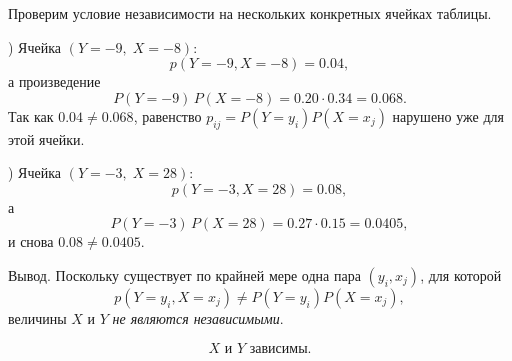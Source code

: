 \documentclass[a4paper,14pt]{extarticle}
\begin{document}
            Проверим условие независимости на нескольких конкретных ячейках таблицы.
            
            ) Ячейка $(Y=-9,\;X=-8)$:
            \[
                p(Y=-9,X=-8)=0.04,
            \]
            а произведение
            \[
                P(Y=-9)\,P(X=-8)=0.20\cdot0.34=0.068.
            \]
            Так как \(0.04 \neq 0.068\), равенство \(p_{ij}=P(Y=y_i)P(X=x_j)\) нарушено уже для этой ячейки.
            
            ) Ячейка $(Y=-3,\;X=28)$:
            \[
                p(Y=-3,X=28)=0.08,
            \]
            а
            \[
                P(Y=-3)\,P(X=28)=0.27\cdot0.15=0.0405,
            \]
            и снова \(0.08 \neq 0.0405\).
            
            \noindent Вывод. Поскольку существует по крайней мере одна пара \((y_i,x_j)\), для которой
            \[
                p(Y=y_i,X=x_j)\neq P(Y=y_i)P(X=x_j),
            \]
            величины $X$ и $Y$ \emph{не являются независимыми}.
            
            \[
                \boxed{\text{$X$ и $Y$ зависимы.}}
            \]
\end{document}
